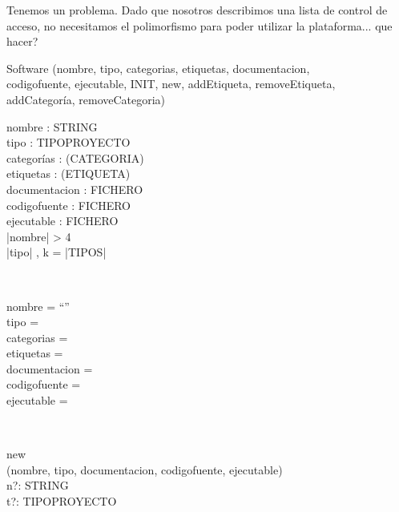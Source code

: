 \documentclass[11pt]{article}
\begin{document}
Tenemos un problema. Dado que nosotros describimos una lista de control de acceso, no necesitamos el polimorfismo para poder utilizar la plataforma... que hacer?



\begin{class}{Software}
\ires(nombre, tipo, categorias, etiquetas, documentacion,\\
codigofuente, ejecutable, INIT, new, addEtiqueta, removeEtiqueta,\\
addCategoría, removeCategoria)\\
\begin{axdef}
nombre : STRING\\
tipo : TIPOPROYECTO\\
categorías : \pset(CATEGORIA)\\
etiquetas : \pset(ETIQUETA)\\
documentacion : FICHERO\\
codigofuente : FICHERO\\
ejecutable : FICHERO\\
\ST
|nombre| > 4\\
|tipo| , k = |TIPOS|\\
\end{axdef} \\
\begin{init}
nombre = ``''\\
tipo = \emptyset\\
categorias = \emptyset\\
etiquetas = \emptyset\\
documentacion = \emptyset\\
codigofuente = \emptyset\\
ejecutable = \emptyset\\
\end{init} \\
\begin{op}{new}\\
\Delta (nombre, tipo, documentacion, codigofuente, ejecutable) \\
n?: STRING\\
t?: TIPOPROYECTO\\

\end{op}
\end{class}
\end{document}
